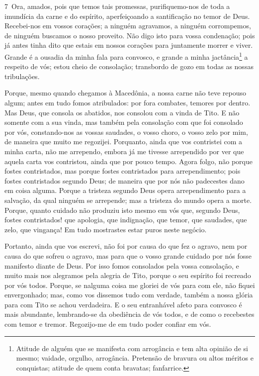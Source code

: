 \medskip

\lettrine{7}\ Ora, amados, pois que temos tais promessas,
purifiquemo-nos de toda a imundícia da carne e do espírito,
aperfeiçoando a santificação no temor de Deus. Recebei-nos em
vossos corações; a ninguém agravamos, a ninguém corrompemos, de
ninguém buscamos o nosso proveito. Não digo isto para vossa
condenação; pois já antes tinha dito que estais em nossos corações
para juntamente morrer e viver. Grande é a ousadia da minha fala
para convosco, e grande a minha jactância\footnote{Atitude de alguém
que se manifesta com arrogância e tem alta opinião de si mesmo;
vaidade, orgulho, arrogância. Pretensão de bravura ou altos méritos
e conquistas; atitude de quem conta bravatas; fanfarrice.} a
respeito de vós; estou cheio de consolação; transbordo de gozo em
todas as nossas tribulações.

Porque, mesmo quando chegamos à Macedônia, a nossa carne não teve
repouso algum; antes em tudo fomos atribulados: por fora combates,
temores por dentro. Mas Deus, que consola os abatidos, nos
consolou com a vinda de Tito. E não somente com a sua vinda, mas
também pela consolação com que foi consolado por vós, constando-nos
as vossas saudades, o vosso choro, o vosso zelo por mim, de maneira
que muito me regozijei. Porquanto, ainda que vos contristei com
a minha carta, não me arrependo, embora já me tivesse arrependido
por ver que aquela carta vos contristou, ainda que por pouco tempo.
Agora folgo, não porque fostes contristados, mas porque fostes
contristados para arrependimento; pois fostes contristados segundo
Deus; de maneira que por nós não padecestes dano em coisa alguma.
Porque a tristeza segundo Deus opera arrependimento para a
salvação, da qual ninguém se arrepende; mas a tristeza do mundo
opera a morte. Porque, quanto cuidado não produziu isto mesmo
em vós que, segundo Deus, fostes contristados! que apologia, que
indignação, que temor, que saudades, que zelo, que vingança! Em tudo
mostrastes estar puros neste negócio.

Portanto, ainda que vos escrevi, não foi por causa do que fez o
agravo, nem por causa do que sofreu o agravo, mas para que o vosso
grande cuidado por nós fosse manifesto diante de Deus. Por
isso fomos consolados pela vossa consolação, e muito mais nos
alegramos pela alegria de Tito, porque o seu espírito foi recreado
por vós todos. Porque, se nalguma coisa me gloriei de vós
para com ele, não fiquei envergonhado; mas, como vos dissemos tudo
com verdade, também a nossa glória para com Tito se achou
verdadeira. E o seu entranhável afeto para convosco é mais
abundante, lembrando-se da obediência de vós todos, e de como o
recebestes com temor e tremor. Regozijo-me de em tudo poder
confiar em vós.

